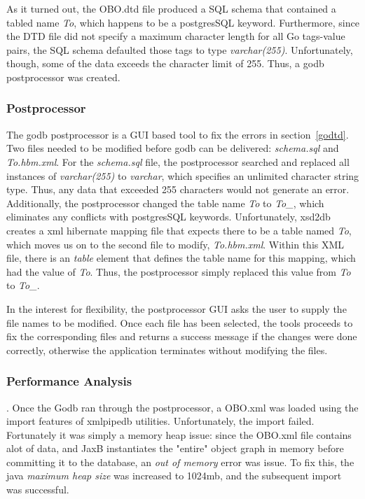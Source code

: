\documentclass[12pt]{article}
\begin{document}
As it turned out, the OBO.dtd file produced a SQL schema that contained a tabled name \emph{To}, which happens to be
a postgresSQL keyword. Furthermore, since the DTD file did not specify a maximum character length for all Go tags-value
pairs, the SQL schema defaulted those tags to type \emph{varchar(255)}. Unfortunately, though, some of the data exceeds the
character limit of 255. Thus, a godb postprocessor was created.

\subsubsection{Postprocessor}
The godb postprocessor is a GUI based tool to fix the errors in section~\ref{godtd}. Two files needed to be modified  before
godb can be delivered: \emph{schema.sql} and \emph{To.hbm.xml}. For the \emph{schema.sql} file, the postprocessor
searched and replaced all instances of \emph{varchar(255)} to \emph{varchar}, which specifies an unlimited character string type.
Thus, any data that exceeded 255 characters would not generate an error. Additionally,
the postprocessor changed the table name \emph{To} to  \emph{To\_}, which eliminates any conflicts with postgresSQL keywords.
Unfortunately, xsd2db
creates a xml hibernate mapping file that expects there to be a table named \emph{To}, which moves us on to the second file to modify,
\emph{To.hbm.xml}. Within this XML file, there is an \emph{table} element that defines the table name for this mapping, which had the
value of \emph{To}. Thus, the postprocessor simply replaced this value from \emph{To} to \emph{To\_}.

In the interest for flexibility, the postprocessor GUI asks the user to supply the file names to be modified.
Once each file has been selected, the tools proceeds to fix the corresponding files and returns a success message
if the changes were done correctly, otherwise the application terminates without modifying the files.

\subsubsection{Performance Analysis}.
Once the Godb ran through the postprocessor, a OBO.xml was loaded using the import features of xmlpipedb utilities.
Unfortunately, the import failed. Fortunately it was simply a memory heap issue: since the OBO.xml file contains alot of data, and
JaxB instantiates the "entire" object graph in memory before committing it to the database, an \emph{out of memory} error was issue.
To fix this, the java \emph{maximum heap size} was increased to 1024mb, and the subsequent import was successful.
\end{document}
